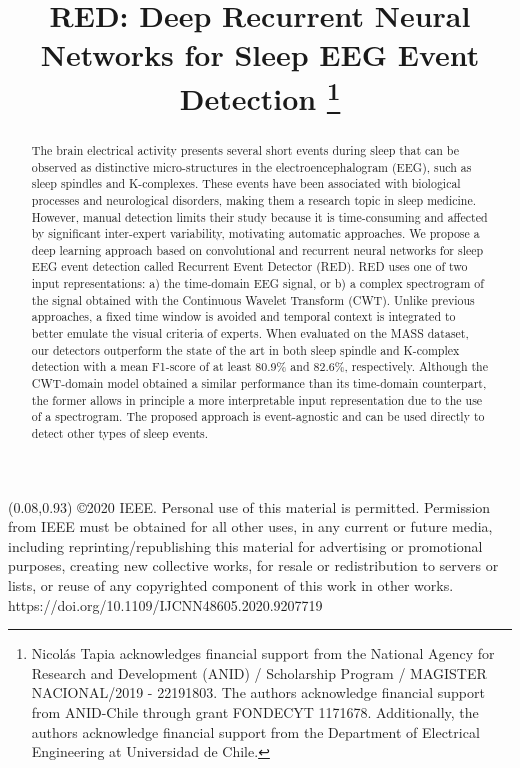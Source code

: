 \documentclass[conference]{IEEEtran}
\newcommand{\copyrightstatement}{
\begin{textblock}{0.84}(0.08,0.93)    \noindent
\footnotesize
\copyright 2020 IEEE. Personal use of this material is permitted. Permission from IEEE must be obtained for all other uses, in any current or future media, including reprinting/republishing this material for advertising or promotional purposes, creating new collective works, for resale or redistribution to servers or lists, or reuse of any copyrighted component of this work in other works. https://doi.org/10.1109/IJCNN48605.2020.9207719
\end{textblock}
}
\begin{document}
\title{RED: Deep Recurrent Neural Networks for Sleep EEG Event Detection
\thanks{Nicol\'as Tapia acknowledges financial support from the National Agency for Research and Development (ANID) /  Scholarship Program / MAGISTER NACIONAL/2019 - 22191803. The authors acknowledge financial support from ANID-Chile through grant FONDECYT 1171678. Additionally, the authors acknowledge financial support from the Department of Electrical Engineering at Universidad de Chile.}
}

\author{
\and
{}
}

\maketitle

\copyrightstatement

\begin{abstract}
The brain electrical activity presents several short events during sleep that can be observed as distinctive micro-structures in the electroencephalogram (EEG), such as sleep spindles and K-complexes. These events have been associated with biological processes and neurological disorders, making them a research topic in sleep medicine. However, manual detection limits their study because it is time-consuming and affected by significant inter-expert variability, motivating automatic approaches. We propose a deep learning approach based on convolutional and recurrent neural networks for sleep EEG event detection called Recurrent Event Detector (RED). RED uses one of two input representations: a) the time-domain EEG signal, or b) a complex spectrogram of the signal obtained with the Continuous Wavelet Transform (CWT). Unlike previous approaches, a fixed time window is avoided and temporal context is integrated to better emulate the visual criteria of experts. When evaluated on the MASS dataset, our detectors outperform the state of the art in both sleep spindle and K-complex detection with a mean F1-score of at least 80.9\% and 82.6\%, respectively. Although the CWT-domain model obtained a similar performance than its time-domain counterpart, the former allows in principle a more interpretable input representation due to the use of a spectrogram. The proposed approach is event-agnostic and can be used directly to detect other types of sleep events.
\end{abstract}
\end{document}

